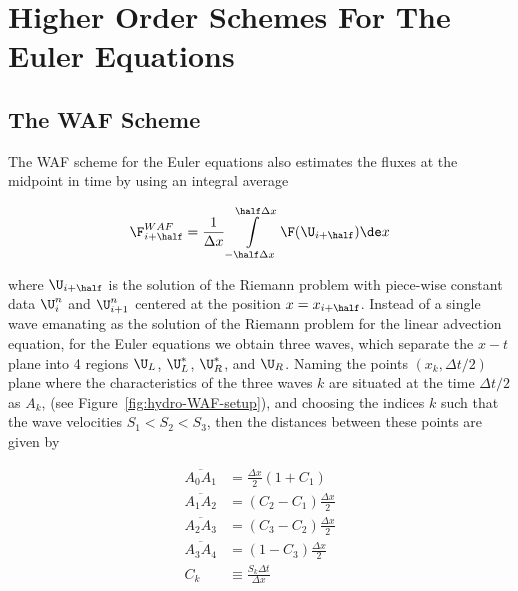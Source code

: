\section{Higher Order Schemes For The Euler Equations}




\subsection{The WAF Scheme}

The WAF scheme for the Euler equations also estimates the fluxes at the midpoint in time by using
an integral average

\begin{align}
\F_{i+\half}^{WAF} = \frac{1}{\Delta x} \int\limits_{-\half \Delta x}^{\half \Delta x}
    \F(\U_{i+\half}) \de x \label{eq:WAF-flux-euler}
\end{align}

where $\U_{i+\half}$ is the solution of the Riemann problem with piece-wise constant data $\U_i^n$
and $\U_{i+1}^n$ centered at the position $x = x_{i+\half}$. Instead of a single wave emanating as
the solution of the Riemann problem for the linear advection equation, for the Euler equations we
obtain three waves, which separate the $x-t$ plane into 4 regions $\U_L$, $\U_L^*$, $\U_R^*$, and
$\U_R$. Naming the points $(x_k,\Delta t/2)$ plane where the characteristics of the three waves $k$
are situated at the time $\Delta t / 2$ as $A_k$, (see Figure~\ref{fig:hydro-WAF-setup}), and
choosing the indices $k$ such that the wave velocities $S_1 < S_2 < S_3$, then the distances
between these points are given by

\begin{align}
    \overline{A_0 A_1} &= \frac{\Delta x}{2} (1 + C_1) \\
    \overline{A_1 A_2} &= (C_2 - C_1) \frac{\Delta x}{2} \\
    \overline{A_2 A_3} &= (C_3 - C_2) \frac{\Delta x}{2} \\
    \overline{A_3 A_4} &= (1 - C_3) \frac{\Delta x}{2} \\
    C_k &\equiv \frac{S_k \Delta t}{\Delta x}
\end{align}


